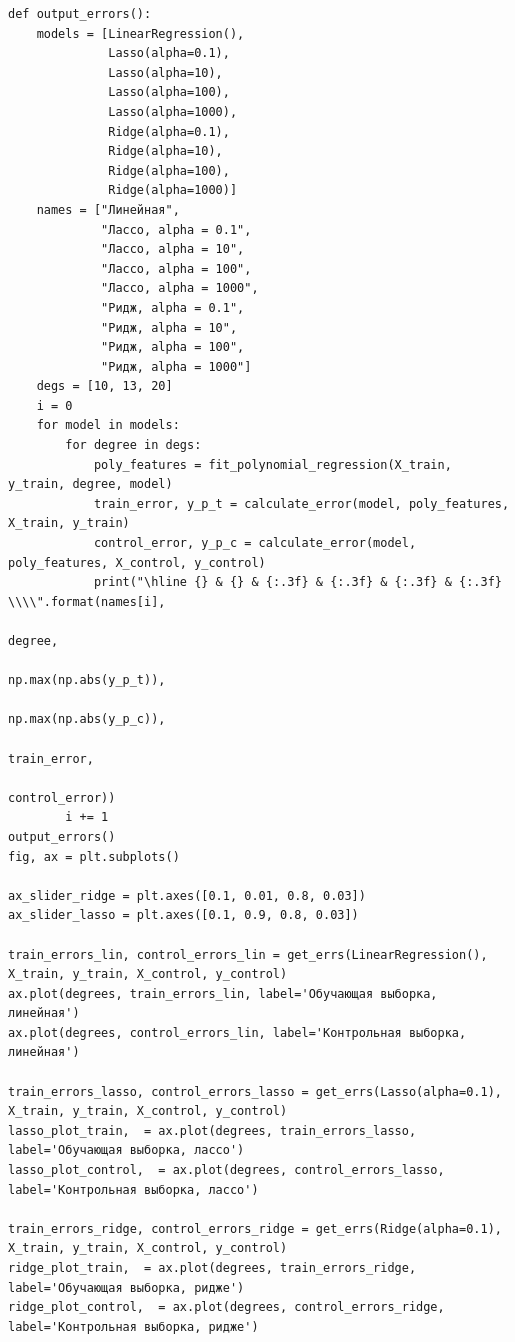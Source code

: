 \documentclass[12pt]{report}
\begin{document}
\begin{lstlisting}[label=lst:gen,caption=код, решающий поставленную задачу]
def output_errors():
    models = [LinearRegression(),
              Lasso(alpha=0.1),
              Lasso(alpha=10),
              Lasso(alpha=100),
              Lasso(alpha=1000),
              Ridge(alpha=0.1),
              Ridge(alpha=10),
              Ridge(alpha=100),
              Ridge(alpha=1000)]
    names = ["Линейная",
             "Лассо, alpha = 0.1",
             "Лассо, alpha = 10",
             "Лассо, alpha = 100",
             "Лассо, alpha = 1000",
             "Ридж, alpha = 0.1",
             "Ридж, alpha = 10",
             "Ридж, alpha = 100",
             "Ридж, alpha = 1000"]
    degs = [10, 13, 20]
    i = 0
    for model in models:
        for degree in degs:
            poly_features = fit_polynomial_regression(X_train, y_train, degree, model)
            train_error, y_p_t = calculate_error(model, poly_features, X_train, y_train)
            control_error, y_p_c = calculate_error(model, poly_features, X_control, y_control)
            print("\hline {} & {} & {:.3f} & {:.3f} & {:.3f} & {:.3f} \\\\".format(names[i],
                                                                 degree,
                                                                 np.max(np.abs(y_p_t)),
                                                                 np.max(np.abs(y_p_c)),
                                                                 train_error,
                                                                 control_error))
        i += 1
output_errors()
fig, ax = plt.subplots()

ax_slider_ridge = plt.axes([0.1, 0.01, 0.8, 0.03])
ax_slider_lasso = plt.axes([0.1, 0.9, 0.8, 0.03])

train_errors_lin, control_errors_lin = get_errs(LinearRegression(), X_train, y_train, X_control, y_control)
ax.plot(degrees, train_errors_lin, label='Обучающая выборка, линейная')
ax.plot(degrees, control_errors_lin, label='Контрольная выборка, линейная')

train_errors_lasso, control_errors_lasso = get_errs(Lasso(alpha=0.1), X_train, y_train, X_control, y_control)
lasso_plot_train,  = ax.plot(degrees, train_errors_lasso, label='Обучающая выборка, лассо')
lasso_plot_control,  = ax.plot(degrees, control_errors_lasso, label='Контрольная выборка, лассо')

train_errors_ridge, control_errors_ridge = get_errs(Ridge(alpha=0.1), X_train, y_train, X_control, y_control)
ridge_plot_train,  = ax.plot(degrees, train_errors_ridge, label='Обучающая выборка, ридже')
ridge_plot_control,  = ax.plot(degrees, control_errors_ridge, label='Контрольная выборка, ридже')


\end{lstlisting}
\end{document}
